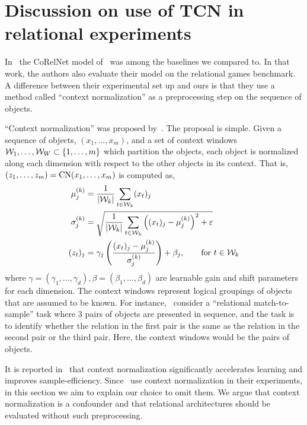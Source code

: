 \section{Discussion on use of TCN in relational experiments}\label{sec:appendix_tcn_discussion}

In~ the CoRelNet model of~\citet{kergNeuralArchitecture2022} was among the baselines we compared to. In that work, the authors also evaluate their model on the relational games benchmark. A difference between their experimental set up and ours is that they use a method called ``context normalization'' as a preprocessing step on the sequence of objects.

``Context normalization'' was proposed by~\citet{webbLearningRepresentationsThat2020}. The proposal is simple. Given a sequence of objects, $(x_1, \ldots, x_m)$, and a set of context windows ${\mathcal{W}}_1, \ldots, {\mathcal{W}}_W \subset \left\{1, \ldots, m\right\}$ which partition the objects, each object is normalized along each dimension with respect to the other objects in its context. That is, $\left(z_1, \ldots, z_m\right) = \mathrm{CN}(x_1, \ldots, x_m)$ is computed as,
\begin{eqnarray*}
    \begin{split}
        \mu_j^{(k)} &= \frac{1}{\left\lvert{\mathcal{W}}_k\right\rvert} \sum_{t \in {\mathcal{W}}_k} (x_t)_j\\
        \sigma_j^{(k)} &= \sqrt{ \frac{1}{\left\lvert{\mathcal{W}}_k\right\rvert} \sum_{t \in {\mathcal{W}}_k} \left((x_t)_j - \mu_j^{(k)}\right)^2 + \varepsilon}\\
        (z_t)_j &= \gamma_j \left(\frac{(x_t)_j - \mu_j^{(k)}}{\sigma_j^{(k)}}\right) + \beta_j, \qquad \text{for } t \in {\mathcal{W}}_k
    \end{split}
\end{eqnarray*}
where $\gamma = (\gamma_1, \ldots, \gamma_d), \beta = (\beta_1, \ldots, \beta_d)$ are learnable gain and shift parameters for each dimension. The context windows represent logical groupings of objects that are assumed to be known. For instance,~\citep{webbEmergentSymbols2021,kergNeuralArchitecture2022} consider a ``relational match-to-sample'' task where 3 pairs of objects are presented in sequence, and the task is to identify whether the relation in the first pair is the same as the relation in the second pair or the third pair. Here, the context windows would be the pairs of objects.

It is reported in~\citep{webbEmergentSymbols2021,kergNeuralArchitecture2022} that context normalization significantly accelerates learning and improves sample-efficiency. Since~\citep{webbEmergentSymbols2021,kergNeuralArchitecture2022} use context normalization in their experiments, in this section we aim to explain our choice to omit them. We argue that context normalization is a confounder and that relational architectures should be evaluated without such preprocessing.

